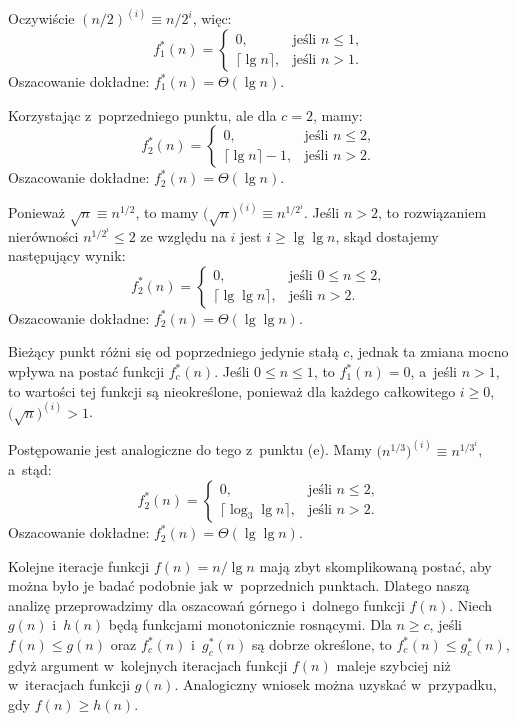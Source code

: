 \subproblem %
Oczywiście $(n/2)^{(i)}\equiv n/2^i$, więc:
\[
	f_1^*(n) =
	\begin{cases}
		0, & \text{jeśli $n\le1$}, \\
		\lceil\lg n\rceil, & \text{jeśli $n>1$}.
	\end{cases}
\]
Oszacowanie dokładne: $f_1^*(n)=\Theta(\lg n)$.

\subproblem %
Korzystając z~poprzedniego punktu, ale dla $c=2$, mamy:
\[
	f_2^*(n) =
	\begin{cases}
		0, & \text{jeśli $n\le2$}, \\
		\lceil\lg n\rceil-1, & \text{jeśli $n>2$}.
	\end{cases}
\]
Oszacowanie dokładne: $f_2^*(n)=\Theta(\lg n)$.

\subproblem %
Ponieważ $\sqrt{n}\equiv n^{1/2}$, to mamy $\bigl(\!\sqrt{n}\bigr)^{(i)}\equiv n^{1/2^i}$\!.
Jeśli $n>2$, to rozwiązaniem nierówności $n^{1/2^i}\le2$ ze względu na $i$ jest $i\ge\lg\lg n$, skąd dostajemy następujący wynik:
\[
	f_2^*(n) =
	\begin{cases}
		0, & \text{jeśli $0\le n\le2$}, \\
		\lceil\lg\lg n\rceil, & \text{jeśli $n>2$}.
	\end{cases}
\]
Oszacowanie dokładne: $f_2^*(n)=\Theta(\lg\lg n)$.

\subproblem %
Bieżący punkt różni się od poprzedniego jedynie stałą $c$, jednak ta zmiana mocno wpływa na postać funkcji $f_c^*(n)$.
Jeśli $0\le n\le1$, to $f_1^*(n)=0$, a~jeśli $n>1$, to wartości tej funkcji są nieokreślone, ponieważ dla każdego całkowitego $i\ge0$, $\bigl(\!\sqrt{n}\bigr)^{(i)}>1$.

\subproblem %
Postępowanie jest analogiczne do tego z~punktu (e).
Mamy $\bigl(n^{1/3}\bigr)^{(i)}\equiv n^{1/3^i}$, a~stąd:
\[
	f_2^*(n) =
	\begin{cases}
		0, & \text{jeśli $n\le2$}, \\
		\lceil\log_3\lg n\rceil, & \text{jeśli $n>2$}.
	\end{cases}
\]
Oszacowanie dokładne: $f_2^*(n)=\Theta(\lg\lg n)$.

\subproblem %
Kolejne iteracje funkcji $f(n)=n/\!\lg n$ mają zbyt skomplikowaną postać, aby można było je badać podobnie jak w~poprzednich punktach.
Dlatego naszą analizę przeprowadzimy dla oszacowań górnego i~dolnego funkcji $f(n)$.
Niech $g(n)$ i~$h(n)$ będą funkcjami monotonicznie rosnącymi.
Dla $n\ge c$, jeśli $f(n)\le g(n)$ oraz $f_c^*(n)$ i~$g_c^*(n)$ są dobrze określone, to $f_c^*(n)\le g_c^*(n)$, gdyż argument w~kolejnych iteracjach funkcji $f(n)$ maleje szybciej niż w~iteracjach funkcji $g(n)$.
Analogiczny wniosek można uzyskać w~przypadku, gdy $f(n)\ge h(n)$.

